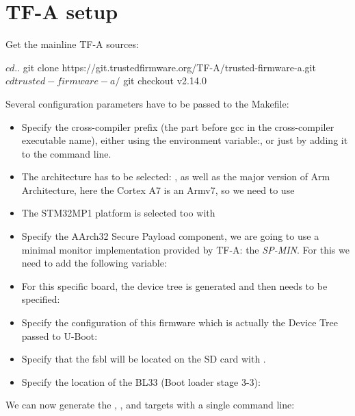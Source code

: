 \section{TF-A setup}

Get the mainline TF-A sources:

\begin{bashinput}
$ cd ..
$ git clone https://git.trustedfirmware.org/TF-A/trusted-firmware-a.git
$ cd trusted-firmware-a/
$ git checkout v2.14.0
\end{bashinput}

Several configuration parameters have to be passed to the Makefile:
\begin{itemize}
\item Specify the cross-compiler prefix (the part before gcc in the
      cross-compiler executable name), either using the environment
      variable:, or just by
      adding it to the  command line.
\item The architecture has to be selected: , as
      well as the major version of Arm Architecture, here the Cortex A7 is
      an Armv7, so we need to use 
\item The STM32MP1 platform is selected too with 
\item Specify the AArch32 Secure Payload component, we are going to
      use a minimal monitor implementation provided by TF-A: the
      {\em SP-MIN}. For this we need to add the following variable:
\item For this specific board, the device tree is generated and then
      needs to be specified: 
\item Specify the configuration of this firmware which is actually
      the Device Tree passed to U-Boot:
\item Specify that the fsbl will be located on the SD
      card with .
\item Specify the location of the BL33 (Boot loader stage 3-3):
\end{itemize}

We can now generate the , , and  targets
with a single command line:


